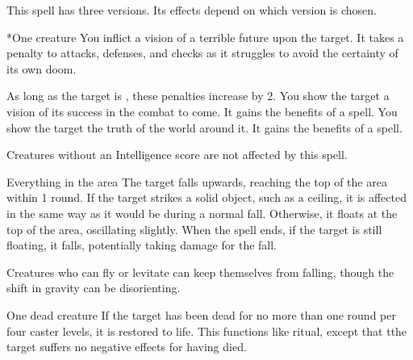 \spellrng{\rngmed}
\spelldur{\durshort}
\spellline
\spellspecial This spell has three versions. Its effects depend on which version is chosen.
\begin{spelltarget}*{One creature}
     You inflict a vision of a terrible future upon the target. It takes a  penalty to attacks, defenses, and checks as it struggles to avoid the certainty of its own doom.

    As long as the target is \bloodied, these penalties increase by 2.
     You show the target a vision of its success in the combat to come. It gains the benefits of a  spell.
     You show the target the truth of the world around it. It gains the benefits of a  spell.
\end{spelltarget}
\spellnotes Creatures without an Intelligence score are not affected by this spell.

\begin{spelltarget}{Everything in the area}
    \spelleffect The target falls upwards, reaching the top of the area within 1 round. If the target strikes a solid object, such as a ceiling, it is affected in the same way as it would be during a normal fall. Otherwise, it floats at the top of the area, oscillating slightly. When the spell ends, if the target is still floating, it falls, potentially taking damage for the fall.
\end{spelltarget}
\spellnotes Creatures who can fly or levitate can keep themselves from falling, though the shift in gravity can be disorienting.

\begin{spelltarget}{One dead creature}
    \spelleffect If the target has been dead for no more than one round per four caster levels, it is restored to life. This functions like  ritual, except that tthe target suffers no negative effects for having died.
\end{spelltarget}
\spellline
{}

